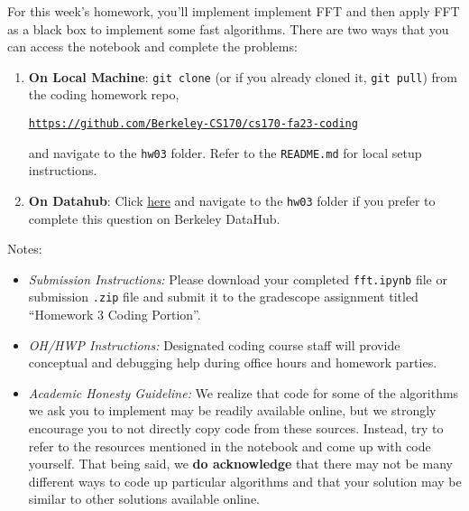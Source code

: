 \documentclass[11pt]{article}
\begin{document}
For this week's homework, you'll implement implement FFT and then apply FFT as a black box to implement some fast algorithms. There are two ways that you can access the notebook and complete the problems:
\begin{enumerate}
    \item \textbf{On Local Machine}: \texttt{git clone} (or if you already cloned it, \texttt{git pull}) from the coding homework repo, 
    
    \href{https://github.com/Berkeley-CS170/cs170-fa23-coding}{\texttt{https://github.com/Berkeley-CS170/cs170-fa23-coding}}
    
    and navigate to the \texttt{hw03} folder. Refer to the \texttt{README.md} for local setup instructions.

    \item \textbf{On Datahub}: Click \href{https://datahub.berkeley.edu/hub/user-redirect/git-pull?repo=https%3A%2F%2Fgithub.com%2FBerkeley-CS170%2Fcs170-fa23-coding&urlpath=tree%2Fcs170-fa23-coding%2Fhw03%2Ffft.ipynb&branch=main}{here} and navigate to the \texttt{hw03} folder if you prefer to complete this question on Berkeley DataHub.
\end{enumerate}


\noindent Notes:
\begin{itemize}
    \item \textit{Submission Instructions:} Please download your completed \texttt{fft.ipynb} file or submission \texttt{.zip} file and submit it to the gradescope assignment titled ``Homework 3 Coding Portion''. 
    
    \item \textit{OH/HWP Instructions:} Designated coding course staff will provide conceptual and debugging help during office hours and homework parties.
    
    \item \textit{Academic Honesty Guideline:} We realize that code for some of the algorithms we ask you to implement may be readily available online, but we strongly encourage you to not directly copy code from these sources. Instead, try to refer to the resources mentioned in the notebook and come up with code yourself. That being said, we \textbf{do acknowledge} that there may not be many different ways to code up particular algorithms and that your solution may be similar to other solutions available online.
    
\end{itemize}
\end{document}
